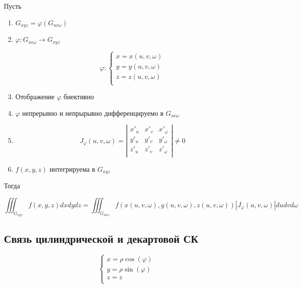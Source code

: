 \documentclass[a4paper, 14pt]{report}
\begin{document}
\begin{theorem}
    Пусть

    \begin{enumerate}
        \item $G_{xyz} = \varphi(G_{uv\omega})$
        \item $\varphi: G_{uv\omega} \to G_{xyz}$

            $$
            \varphi : 
            \begin{cases}
                x = x(u, v, \omega) \\
                y = y(u, v, \omega) \\
                z = z(u, v, \omega) \\
            \end{cases}
            $$

        \item Отображение $\varphi$ биективно
        \item $\varphi$ непрерывно и непрырывно дифференцируемо в $G_{uv\omega}$
        \item 
            $$
            J_\varphi(u,v,\omega) = \left|
            \begin{matrix}
                x'_u & x'_v & x'_\omega \\
                y'_u & y'_v & y'_\omega \\
                z'_u & z'_v & z'_\omega \\
            \end{matrix}
            \right| \ne 0
            $$
        \item $f(x,y,z)$ интегрируема в $G_{xyz}$
    \end{enumerate}

    Тогда

    $$
    \iiint_{G_{xyz}} f(x,y,z)dxdydz = \iiint_{G_{uv\omega}} f(x(u,v,\omega), y(u,v,\omega), z(u,v,\omega)) |J_\varphi(u,v,\omega)| dudvd\omega
    $$
\end{theorem}

\subsection{Связь цилиндрической и декартовой СК}

$$
\begin{cases}
    x = \rho \cos(\varphi) \\
    y = \rho \sin(\varphi) \\
    z = z \\
\end{cases}
$$
\end{document}
